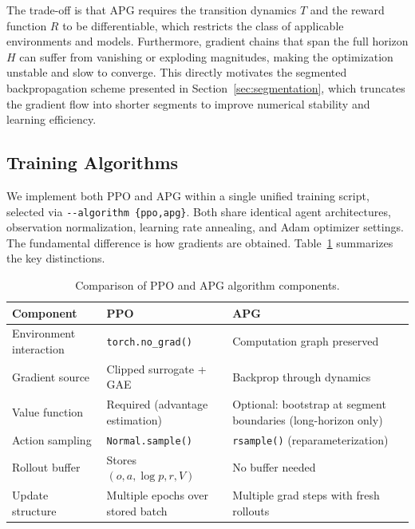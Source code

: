 \documentclass[11pt,a4paper]{article}
\begin{document}
The trade-off is that APG requires the transition dynamics $T$ and the reward function $R$ to be differentiable, which restricts the class of applicable environments and models. Furthermore, gradient chains that span the full horizon $H$ can suffer from vanishing or exploding magnitudes, making the optimization unstable and slow to converge. This directly motivates the segmented backpropagation scheme presented in Section~\ref{sec:segmentation}, which truncates the gradient flow into shorter segments to improve numerical stability and learning efficiency.
\subsection{Training Algorithms}
\label{sec:training_algorithms}

We implement both PPO and APG within a single unified training script, selected via \texttt{-{}-algorithm \{ppo,apg\}}. Both share identical agent architectures, observation normalization, learning rate annealing, and Adam optimizer settings. The fundamental difference is how gradients are obtained. Table~\ref{tab:ppo_vs_apg} summarizes the key distinctions.

\begin{table}[htbp]
  \centering
  \caption{Comparison of PPO and APG algorithm components.}
  \label{tab:ppo_vs_apg}
  \setlength{\extrarowheight}{3pt}
  \begin{tabularx}{\linewidth}{@{} l >{\raggedright\arraybackslash}X >{\raggedright\arraybackslash}X @{}}
    \toprule
    \rowcolor{gray!15}
    \textbf{Component} & \textbf{PPO} & \textbf{APG} \\
    \midrule
    Environment interaction  & \texttt{torch.no\_grad()}         & Computation graph preserved \\
    \rowcolor{gray!8}
    Gradient source          & Clipped surrogate + GAE            & Backprop through dynamics \\
    Value function           & Required (advantage estimation)    & Optional: bootstrap at segment boundaries (long-horizon only) \\
    \rowcolor{gray!8}
    Action sampling          & \texttt{Normal.sample()}           & \texttt{rsample()} (reparameterization) \\
    Rollout buffer           & Stores $(o, a, \log p, r, V)$     & No buffer needed \\
    \rowcolor{gray!8}
    Update structure         & Multiple epochs over stored batch  & Multiple grad steps with fresh rollouts \\
    \bottomrule
  \end{tabularx}
\end{table}
\end{document}
